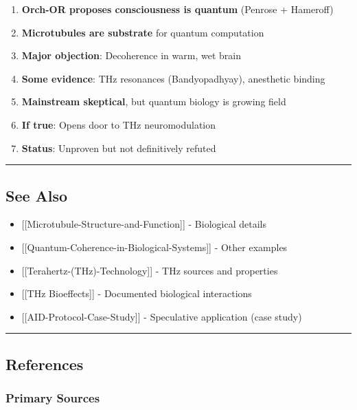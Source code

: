 \begin{enumerate}
\def\labelenumi{\arabic{enumi}.}
\tightlist
\item
  \textbf{Orch-OR proposes consciousness is quantum} (Penrose +
  Hameroff)
\item
  \textbf{Microtubules are substrate} for quantum computation
\item
  \textbf{Major objection}: Decoherence in warm, wet brain
\item
  \textbf{Some evidence}: THz resonances (Bandyopadhyay), anesthetic
  binding
\item
  \textbf{Mainstream skeptical}, but quantum biology is growing field
\item
  \textbf{If true}: Opens door to THz neuromodulation
\item
  \textbf{Status}: Unproven but not definitively refuted
\end{enumerate}

\begin{center}\rule{0.5\linewidth}{0.5pt}\end{center}

\subsection{See Also}\label{see-also}

\begin{itemize}
\tightlist
\item
  {[}{[}Microtubule-Structure-and-Function{]}{]} - Biological details
\item
  {[}{[}Quantum-Coherence-in-Biological-Systems{]}{]} - Other examples
\item
  {[}{[}Terahertz-(THz)-Technology{]}{]} - THz sources and properties
\item
  {[}{[}THz Bioeffects{]}{]} - Documented biological interactions
\item
  {[}{[}AID-Protocol-Case-Study{]}{]} - Speculative application (case
  study)
\end{itemize}

\begin{center}\rule{0.5\linewidth}{0.5pt}\end{center}

\subsection{References}\label{references}

\subsubsection{Primary Sources}\label{primary-sources}

